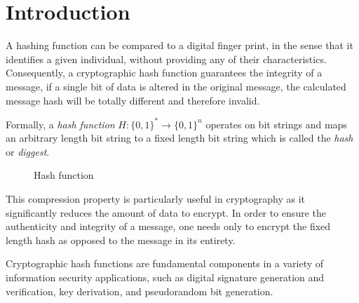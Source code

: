 \chapter*{Introduction}
A hashing function can be compared to a digital finger print, in the sense that it identifies a given individual, without providing any of their characteristics. Consequently, a cryptographic hash function guarantees the integrity of a message, if a single bit of data is altered in the original message, the calculated message hash will be totally different and therefore invalid.

Formally, a \emph{hash function} $H:{\{0,1\}}^* \rightarrow {\{0,1\}}^n$ operates on bit strings and maps an arbitrary length bit string to a fixed length bit string which is called the \emph{hash} or \emph{diggest}.

\begin{figure}[!ht]
\centering
{}
\caption{\label{fig:hachage}Hash function}
\end{figure}

This compression property is particularly useful in cryptography as it significantly reduces the amount of data to encrypt. In order to ensure the authenticity and integrity of a message, one needs only to encrypt the fixed length hash as opposed to the message in its entirety.

Cryptographic hash functions are fundamental components in a variety of information security applications, such as digital signature generation and verification, key derivation, and pseudorandom bit generation.

